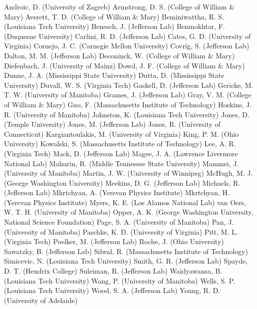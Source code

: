 Androic, D. (University of Zagreb)
Armstrong, D. S. (College of William \& Mary)
Averett, T. D. (College of William \& Mary)
Beminiwattha, R. S. (Louisiana Tech University)
Benesch, J. (Jefferson Lab)
Benmokhtar, F. (Duquesne University)
Carlini, R. D. (Jefferson Lab)
Cates, G. D. (University of Virginia)
Cornejo, J. C. (Carnegie Mellon University)
Covrig, S. (Jefferson Lab)
Dalton, M. M. (Jefferson Lab)
Deconinck, W. (College of William \& Mary)
Diefenbach, J. (University of Mainz)
Dowd, J. F. (College of William \& Mary)
Dunne, J. A. (Mississippi State University)
Dutta, D. (Mississippi State University)
Duvall, W. S. (Virginia Tech)
Gaskell, D. (Jefferson Lab)
Gericke, M. T. W. (University of Manitoba)
Grames, J. (Jefferson Lab)
Gray, V. M. (College of William \& Mary)
Guo, F. (Massachusetts Institute of Technology)
Hoskins, J. R. (University of Manitoba)
Johnston, K. (Louisiana Tech University)
Jones, D. (Temple University)
Jones, M. (Jefferson Lab)
Jones, R. (University of Connecticut)
Kargiantoulakis, M. (University of Virginia)
King, P. M. (Ohio University)
Kowalski, S. (Massachusetts Institute of Technology)
Lee, A. R. (Virginia Tech)
Mack, D. (Jefferson Lab)
Magee, J. A. (Lawrence Livermore National Lab)
Mahurin, R. (Middle Tennessee State University)
Mammei, J. (University of Manitoba)
Martin, J. W. (University of Winnipeg)
McHugh, M. J. (George Washington University)
Meekins, D. G. (Jefferson Lab)
Michaels, R. (Jefferson Lab)
Mkrtchyan, A. (Yerevan Physics Institute)
Mkrtchyan, H. (Yerevan Physics Institute)
Myers, K. E. (Los Alamos National Lab)
van Oers, W. T. H. (University of Manitoba)
Opper, A. K. (George Washington University, National Science Foundation)
Page, S. A. (University of Manitoba)
Pan, J. (University of Manitoba)
Paschke, K. D. (University of Virginia)
Pitt, M. L. (Virginia Tech)
Poelker, M. (Jefferson Lab)
Roche, J. (Ohio University)
Sawatzky, B. (Jefferson Lab)
Silwal, R. (Massachusetts Institute of Technology)
Simicevic, N. (Louisiana Tech University)
Smith, G. R. (Jefferson Lab)
Spayde, D. T. (Hendrix College)
Suleiman, R. (Jefferson Lab)
Waidyawansa, B. (Louisiana Tech University)
Wang, P. (University of Manitoba)
Wells, S. P. (Louisiana Tech University)
Wood, S. A. (Jefferson Lab)
Young, R. D. (University of Adelaide)
